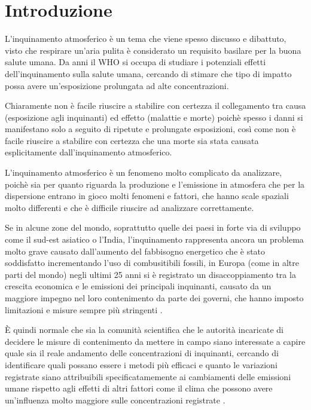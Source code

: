 \documentclass[a4paper,12pt]{report}
\begin{document}
\tableofcontents


\chapter{Introduzione}
L'inquinamento atmosferico è un tema che viene spesso discusso e dibattuto, visto che respirare un'aria pulita è considerato un requisito basilare per la buona salute umana. Da anni il WHO \cite{world2006air} si occupa di studiare i potenziali effetti dell'inquinamento sulla salute umana, cercando di stimare che tipo di impatto possa avere un'esposizione prolungata ad alte concentrazioni.  

Chiaramente non è facile riuscire a stabilire con certezza il collegamento tra causa (esposizione agli inquinanti) ed effetto (malattie e morte) poichè spesso i danni si manifestano solo a seguito di ripetute e prolungate esposizioni, così come non è facile riuscire a stabilire con certezza che una morte sia stata causata esplicitamente dall'inquinamento atmosferico.  

L'inquinamento atmosferico è un fenomeno molto complicato da analizzare, poichè sia per quanto riguarda la produzione e l'emissione in atmosfera che per la dispersione entrano in gioco molti fenomeni e fattori, che hanno scale spaziali molto differenti e che è difficile riuscire ad analizzare correttamente.  

Se in alcune zone del mondo, soprattutto quelle dei paesi in forte via di sviluppo come il sud-est asiatico o l'India, l'inquinamento rappresenta ancora un problema molto grave causato dall'aumento del fabbisogno energetico che è stato soddisfatto incrementando l'uso di combusitibili fossili, in Europa (come in altre parti del mondo) negli ultimi 25 anni si è registrato un disaccoppiamento tra la crescita economica e le emissioni dei principali inquinanti, causato da un maggiore impegno nel loro contenimento da parte dei governi, che hanno imposto limitazioni e misure sempre più stringenti \cite{cattani2014analisi}.

È quindi normale che sia la comunità scientifica che le autorità incaricate di decidere le misure di contenimento da mettere in campo siano interessate a capire quale sia il reale andamento delle concentrazioni di inquinanti, cercando di identificare quali possano essere i metodi più efficaci e quanto le variazioni registrate siano attribuibili specificatamemente ai cambiamenti delle emissioni umane rispetto agli effetti di altri fattori come il clima che possono avere un'influenza molto maggiore sulle concentrazioni registrate \cite{porter2001ozone}.  
\end{document}
